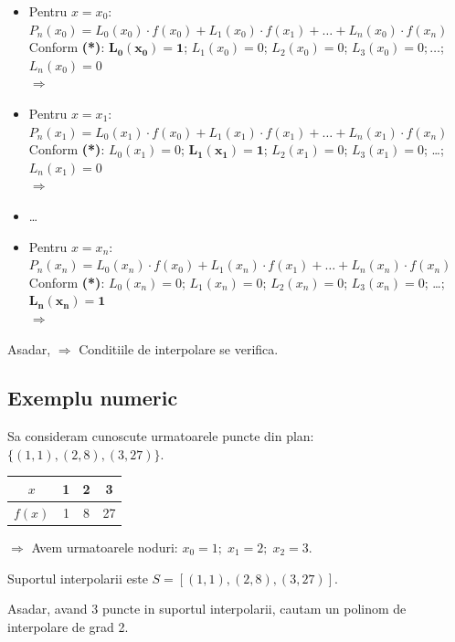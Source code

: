 \documentclass{article}
\begin{document}
\begin{itemize}
    \item Pentru $x = x_0$: $P_n(x_0) = L_0(x_0) \cdot f(x_0) + L_1(x_0) \cdot f(x_1) + \dots + L_n(x_0) \cdot f(x_n)$\\
    Conform \textbf{(*)}:
    $\mathbf{L_0(x_0) = 1}$; $L_1(x_0) = 0$; $L_2(x_0) = 0$; $L_3(x_0) = 0; \dots$; $L_n(x_0) = 0$\\
    $\Longrightarrow$ 
    
    \item Pentru $x = x_1$: $P_n(x_1) = L_0(x_1) \cdot f(x_0) + L_1(x_1) \cdot f(x_1) + \dots + L_n(x_1) \cdot f(x_n)$\\
    Conform \textbf{(*)}:
    $L_0(x_1) = 0$; $\mathbf{L_1(x_1) = 1}$; $L_2(x_1) = 0$; $L_3(x_1) = 0$; \dots; $L_n(x_1) = 0$\\
    $\Longrightarrow$ 
    
    \item \dots
    
    \item Pentru $x = x_n$: $P_n(x_n) = L_0(x_n) \cdot f(x_0) + L_1(x_n) \cdot f(x_1) + \dots + L_n(x_n) \cdot f(x_n)$\\
    Conform \textbf{(*)}:
    $L_0(x_n) = 0$; $L_1(x_n) = 0$; $L_2(x_n) = 0$; $L_3(x_n) = 0$; \dots; $\mathbf{L_n(x_n) = 1}$\\
    $\Longrightarrow$ 
\end{itemize}

Asadar,  $\Longrightarrow$ Conditiile de interpolare se verifica.


\subsection{Exemplu numeric}
\tab Sa consideram cunoscute urmatoarele puncte din plan: $\{(1,1), (2,8), (3,27)\}$.

\begin{tabular}{c | c | c | c}
    $x$ & 1 & 2 & 3 \\
    \hline
    $f(x)$ & 1 & 8 & 27 \\
\end{tabular}
$\Rightarrow$ Avem urmatoarele noduri: $x_0=1;\; x_1=2;\; x_2=3$.

Suportul interpolarii este $S=[(1,1), (2,8), (3,27)]$.

Asadar, avand 3 puncte in suportul interpolarii, cautam un polinom de interpolare de grad 2.\\
\end{document}
